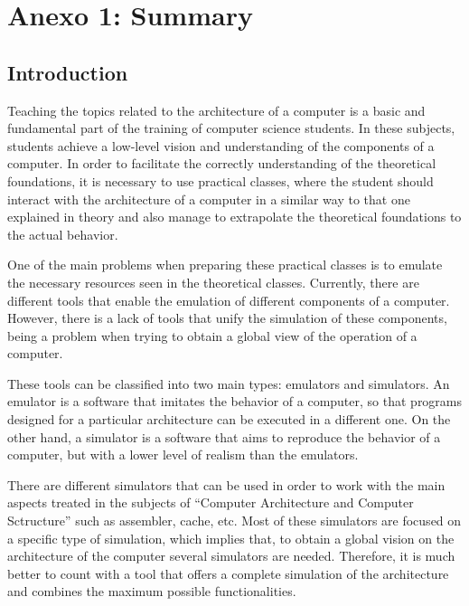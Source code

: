 \chead[]{}
\renewcommand{\headrulewidth}{0.5pt}

\lfoot[]{}
\cfoot[]{}
\rfoot[]{}
\renewcommand{\footrulewidth}{0pt}




\chapter*{Anexo 1: Summary}

\section*{Introduction}

Teaching the topics related to the architecture of a computer is a basic and fundamental part of the training of computer science students. In these subjects, students achieve a low-level vision and understanding of the components of a computer. In order to facilitate the correctly understanding of the theoretical foundations, it is necessary to use practical classes, where the student should interact with the architecture of a computer in a similar way to that one explained in theory and also manage to extrapolate the theoretical foundations to the actual behavior.

One of the main problems when preparing these practical classes is to emulate the necessary resources seen  in the theoretical classes. Currently, there are different tools that enable the emulation of different components of a computer. However, there is a lack of tools that unify the simulation of these components, being a problem when trying to obtain a global view of the operation of a computer.

These tools can be classified into two main types: emulators and simulators. An emulator is a software that imitates the behavior of a computer, so that programs designed for a particular architecture can be executed in a different one. On the other hand, a simulator is a software that aims to reproduce the behavior of a computer, but with a lower level of realism than the emulators.

There are different simulators that can be used in order to work with the main aspects treated in the subjects of ``Computer Architecture and Computer Sctructure'' such as assembler, cache, etc. Most of these simulators are focused on a specific type of simulation, which implies that, to obtain a global vision on the architecture of the computer several simulators are needed. Therefore, it is much better to count with a tool that offers a complete simulation of the architecture and combines the maximum possible functionalities.

